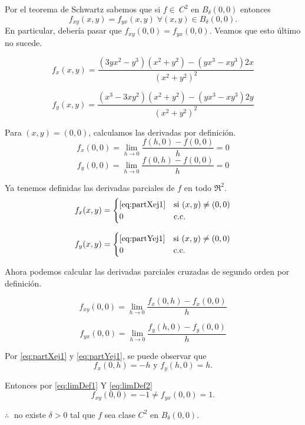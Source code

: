 \begin{solution}
    Por el teorema de Schwartz sabemos que si $f \in\ C^2$ en  $B_{\delta}(0,0)$
    entonces $$  f_{xy} (x,y) = f_{yx} (x,y) \; \forall (x,y) \in B_{\delta}(0,0).$$ En particular, deber\'ia pasar que $f_{xy} (0,0) = f_{yx}(0,0).$ Veamos que esto \'ultimo no sucede.

    \begin{equation}
        f_x(x,y) = \frac{(3yx^2-y^3)(x^2+y^2) - (yx^3-xy^3)2x}{(x^2+y^2)^2} \label{eq:partXej1}
    \end{equation}

    \begin{equation}
        f_y(x,y) = \frac{(x^3-3xy^2)(x^2+y^2) - (yx^3-xy^3)2y}{(x^2+y^2)^2}  \label{eq:partYej1}
    \end{equation}

    Para $(x,y) = (0,0)$, calculamos las derivadas por definición.
    \[
        f_x(0,0)  = \lim_{h\to0} \frac{f(h,0) - f(0,0)}{h} = 0
    \]
    \[
        f_y(0,0)  =  \lim_{h\to0} \frac{f(0,h) - f(0,0)}{h} = 0
    \]

    Ya tenemos definidas las derivadas parciales de $f$ en todo $\Re^{2}.$
    \[
        f_x(x,y) =
        \begin{cases}
            \eqref{eq:partXej1} & \text{si}\ (x,y) \neq (0,0) \\
            0                   & \text{c.c.}
        \end{cases}
    \]

    \[
        f_y(x,y) =
        \begin{cases}
            \eqref{eq:partYej1} & \text{si}\ (x,y) \neq (0,0) \\
            0                   & \text{c.c.}
        \end{cases}
    \]

    Ahora podemos calcular las derivadas parciales cruzadas de segundo orden por definición.

    \begin{equation}
        f_{xy}(0,0) = \lim_{h\to0} \frac{f_x(0,h) - f_x(0,0)}{h} \label{eq:limDef1}
    \end{equation}

    \begin{equation}
        f_{yx}(0,0) = \lim_{h\to0} \frac{f_y(h,0) - f_y(0,0)}{h}  \label{eq:limDef2}
    \end{equation}

    Por \eqref{eq:partXej1} y \eqref{eq:partYej1}, se puede observar que
    \[
        f_x(0,h) = -h \text{ y } f_y(h,0) = h.
    \]

    Entonces por \eqref{eq:limDef1} Y \eqref{eq:limDef2}
    \[
        f_{xy}(0,0) = -1 \neq f_{yx}(0,0) = 1.
    \]

    $\therefore\;$ no existe $\delta>0$ tal que $f$ sea clase $C^2$ en $B_{\delta}(0,0)$.
\end{solution}

